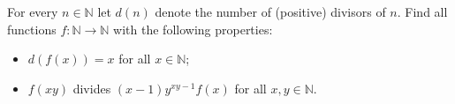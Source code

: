 For every $n \in \mathbb{N}$ let $d(n)$ denote the number of (positive) divisors of $n$. Find all functions $f : \mathbb{N} \to \mathbb{N}$ with the following properties:

\begin{itemize}
\item[(i)] $d(f(x)) = x$ for all $x \in \mathbb{N}$;
\item[(ii)] $f(xy)$ divides $(x - 1) y^{xy - 1} f(x)$ for all $x, y \in \mathbb{N}$.
\end{itemize}
